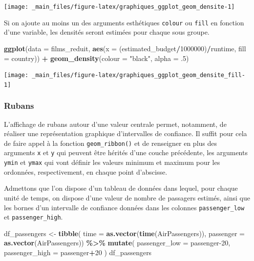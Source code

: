 \documentclass[
  11pt,
]{book}
\newenvironment{Shaded}{\begin{snugshade}}{\end{snugshade}}
\newcommand{\DataTypeTok}[1]{\textcolor[rgb]{0.13,0.29,0.53}{#1}}
\newcommand{\DecValTok}[1]{\textcolor[rgb]{0.00,0.00,0.81}{#1}}
\newcommand{\FloatTok}[1]{\textcolor[rgb]{0.00,0.00,0.81}{#1}}
\newcommand{\KeywordTok}[1]{\textcolor[rgb]{0.13,0.29,0.53}{\textbf{#1}}}
\newcommand{\NormalTok}[1]{#1}
\newcommand{\OperatorTok}[1]{\textcolor[rgb]{0.81,0.36,0.00}{\textbf{#1}}}
\newcommand{\StringTok}[1]{\textcolor[rgb]{0.31,0.60,0.02}{#1}}
\numberwithin{equation}{section}
\numberwithin{countremarque}{section}
\begin{document}
\begin{center}\texttt{[image: \_main\_files/figure-latex/graphiques\_ggplot\_geom\_densite-1]} \end{center}

Si on ajoute au moins un des arguments esthétiques \texttt{colour} ou \texttt{fill} en fonction d'une variable, les densités seront estimées pour chaque sous groupe.

\begin{Shaded}
\begin{Highlighting}[]
\KeywordTok{ggplot}\NormalTok{(}\DataTypeTok{data =}\NormalTok{ films\_reduit,}
       \KeywordTok{aes}\NormalTok{(}\DataTypeTok{x =}\NormalTok{ (estimated\_budget}\OperatorTok{/}\DecValTok{1000000}\NormalTok{)}\OperatorTok{/}\NormalTok{runtime,}
           \DataTypeTok{fill =}\NormalTok{ country)) }\OperatorTok{+}
\StringTok{  }\KeywordTok{geom\_density}\NormalTok{(}\DataTypeTok{colour =} \StringTok{"black"}\NormalTok{, }\DataTypeTok{alpha =} \FloatTok{.5}\NormalTok{)}
\end{Highlighting}
\end{Shaded}

\begin{center}\texttt{[image: \_main\_files/figure-latex/graphiques\_ggplot\_geom\_densite\_fill-1]} \end{center}

\hypertarget{rubans}{%
\subsubsection{Rubans}\label{rubans}}

L'affichage de rubans autour d'une valeur centrale permet, notamment, de réaliser une représentation graphique d'intervalles de confiance. Il suffit pour cela de faire appel à la fonction \texttt{geom\_ribbon()} et de renseigner en plus des arguments \texttt{x} et \texttt{y} qui peuvent être hérités d'une couche précédente, les arguments \texttt{ymin} et \texttt{ymax} qui vont définir les valeurs minimum et maximum pour les ordonnées, respectivement, en chaque point d'abscisse.

Admettons que l'on dispose d'un tableau de données dans lequel, pour chaque unité de temps, on dispose d'une valeur de nombre de passagers estimés, ainsi que les bornes d'un intervalle de confiance données dans les colonnes \texttt{passenger\_low} et \texttt{passenger\_high}.

\begin{Shaded}
\begin{Highlighting}[]
\NormalTok{df\_passengers \textless{}{-}}\StringTok{ }
\StringTok{  }\KeywordTok{tibble}\NormalTok{(}
  \DataTypeTok{time =} \KeywordTok{as.vector}\NormalTok{(}\KeywordTok{time}\NormalTok{(AirPassengers)),}
  \DataTypeTok{passenger =} \KeywordTok{as.vector}\NormalTok{(AirPassengers)) }\OperatorTok{\%\textgreater{}\%}\StringTok{ }
\StringTok{  }\KeywordTok{mutate}\NormalTok{(}
    \DataTypeTok{passenger\_low =}\NormalTok{ passenger}\DecValTok{{-}20}\NormalTok{,}
    \DataTypeTok{passenger\_high =}\NormalTok{ passenger}\OperatorTok{+}\DecValTok{20}
\NormalTok{  )}
\NormalTok{df\_passengers}
\end{Highlighting}
\end{Shaded}
\end{document}
